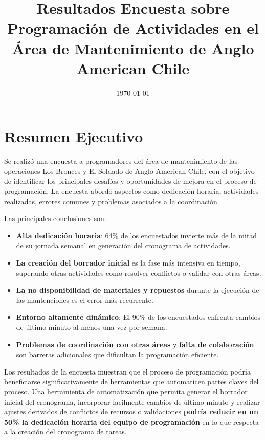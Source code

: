 \documentclass{article}
\title{Resultados Encuesta sobre Programación de Actividades en el Área de Mantenimiento de Anglo American Chile}
\date{\today}
\begin{document}
\maketitle

\section*{Resumen Ejecutivo}

Se realizó una encuesta a programadores del área de mantenimiento de las operaciones Los Bronces y El Soldado de Anglo American Chile, con el objetivo de identificar los principales desafíos y oportunidades de mejora en el proceso de programación. La encuesta abordó aspectos como dedicación horaria, actividades realizadas, errores comunes y problemas asociados a la coordinación.

Las principales conclusiones son:

\begin{itemize}
    \item \textbf{Alta dedicación horaria}: 64\% de los encuestados invierte más de la mitad de su jornada semanal en generación del cronograma de actividades.
    \item \textbf{La creación del borrador inicial} es la fase más intensiva en tiempo, superando otras actividades como resolver conflictos o validar con otras áreas.
    \item \textbf{La no disponibilidad de materiales y repuestos} durante la ejecución de las mantenciones es el error más recurrente.
    \item \textbf{Entorno altamente dinámico}: El 90\% de los encuestados enfrenta cambios de último minuto al menos una vez por semana.
    \item \textbf{Problemas de coordinación con otras áreas} y \textbf{falta de colaboración} son barreras adicionales que dificultan la programación eficiente.
\end{itemize}

Los resultados de la encuesta muestran que el proceso de programación podría beneficiarse significativamente de herramientas que automaticen partes claves del proceso. Una herramienta de automatización que permita generar el borrador inicial del cronograma, incorporar facilmente cambios de último minuto y realizar ajustes derivados de conflictos de recursos o validaciones \textbf{podría reducir en un 50\% la dedicación horaria del equipo de programación} en lo que respecta a la creación del cronograma de tareas. 
\end{document}
